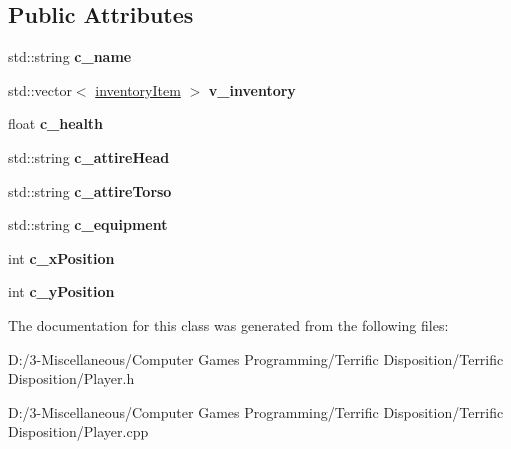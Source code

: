 \subsection*{Public Attributes}
\begin{DoxyCompactItemize}
\item 
\mbox{\label{class_player_ac5bb971a4e7ccb316b82f8102fd8376f}} 
std\+::string {\bfseries c\+\_\+name}
\item 
\mbox{\label{class_player_a48e88126703bf85bbc7588c055d113bd}} 
std\+::vector$<$ \hyperlink{structinventory_item}{inventory\+Item} $>$ {\bfseries v\+\_\+inventory}
\item 
\mbox{\label{class_player_a2480b4e21482006c6bc80999338e1170}} 
float {\bfseries c\+\_\+health}
\item 
\mbox{\label{class_player_a9c71dff9d97ef1266f9dcff49dec0a5a}} 
std\+::string {\bfseries c\+\_\+attire\+Head}
\item 
\mbox{\label{class_player_a266d7dc412503fa968ced9f495072c32}} 
std\+::string {\bfseries c\+\_\+attire\+Torso}
\item 
\mbox{\label{class_player_a2704ec2371cc2a90429a7098454e1d50}} 
std\+::string {\bfseries c\+\_\+equipment}
\item 
\mbox{\label{class_player_aa3edb7a85958c7fc769e61d09ec22d3d}} 
int {\bfseries c\+\_\+x\+Position}
\item 
\mbox{\label{class_player_a8f5ec81c33424db361b92c89bef0c0fd}} 
int {\bfseries c\+\_\+y\+Position}
\end{DoxyCompactItemize}


The documentation for this class was generated from the following files\+:\begin{DoxyCompactItemize}
\item 
D\+:/3-\/\+Miscellaneous/\+Computer Games Programming/\+Terrific Disposition/\+Terrific Disposition/Player.\+h\item 
D\+:/3-\/\+Miscellaneous/\+Computer Games Programming/\+Terrific Disposition/\+Terrific Disposition/Player.\+cpp\end{DoxyCompactItemize}
